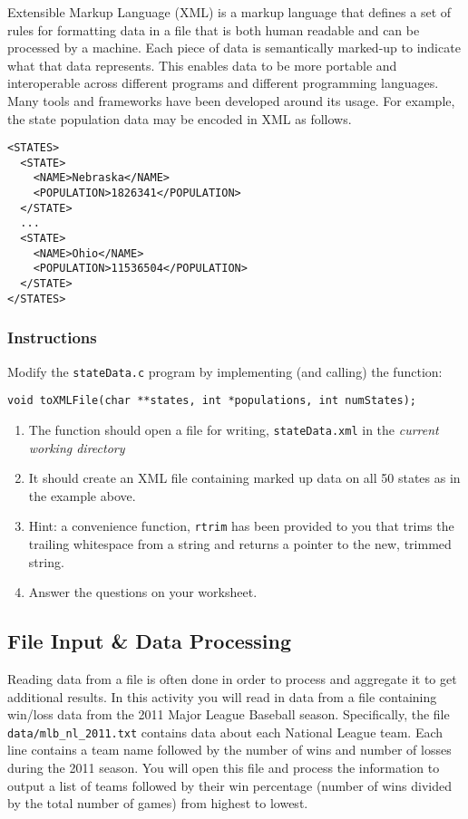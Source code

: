 \documentclass[12pt]{scrartcl}
\begin{document}
Extensible Markup Language (XML) is a markup language that defines a set 
of rules for formatting data in a file that is both human readable and can be 
processed by a machine.  Each piece of data is semantically marked-up to 
indicate what that data represents.  This enables data to be more portable 
and interoperable across different programs and different programming 
languages.  Many tools and frameworks have been developed around its 
usage.  For example, the state population data may be encoded in XML 
as follows.

\begin{verbatim}
<STATES>
  <STATE>
    <NAME>Nebraska</NAME>
    <POPULATION>1826341</POPULATION>
  </STATE>
  ...
  <STATE>
    <NAME>Ohio</NAME>
    <POPULATION>11536504</POPULATION>
  </STATE>
</STATES>
\end{verbatim}

\subsubsection*{Instructions}

Modify the \texttt{stateData.c} program by implementing 
(and calling) the function:

\texttt{void toXMLFile(char **states, int *populations, int numStates);}

\begin{enumerate}
  \item The function should open a file for writing, \texttt{stateData.xml} 
  in the \emph{current working directory}
  \item It should create an XML file containing marked up data on all 50 states 
	as in the example above.  
  \item Hint: a convenience function, \texttt{rtrim} has been provided 
	to you that trims the trailing whitespace from a string and returns a pointer 
	to the new, trimmed string.
  \item Answer the questions on your worksheet.
\end{enumerate}
	
\subsection{File Input \& Data Processing}

Reading data from a file is often done in order to process and aggregate it to 
get additional results.  In this activity you will read in data from a file containing 
win/loss data from the 2011 Major League Baseball season.  Specifically, the 
file \texttt{data/mlb_nl_2011.txt} contains data about each National League 
team.  Each line contains a team name followed by the number of wins and 
number of losses during the 2011 season.  You will open this file and process 
the information to output a list of teams followed by their win percentage 
(number of wins divided by the total number of games) from highest to lowest.
\end{document}
